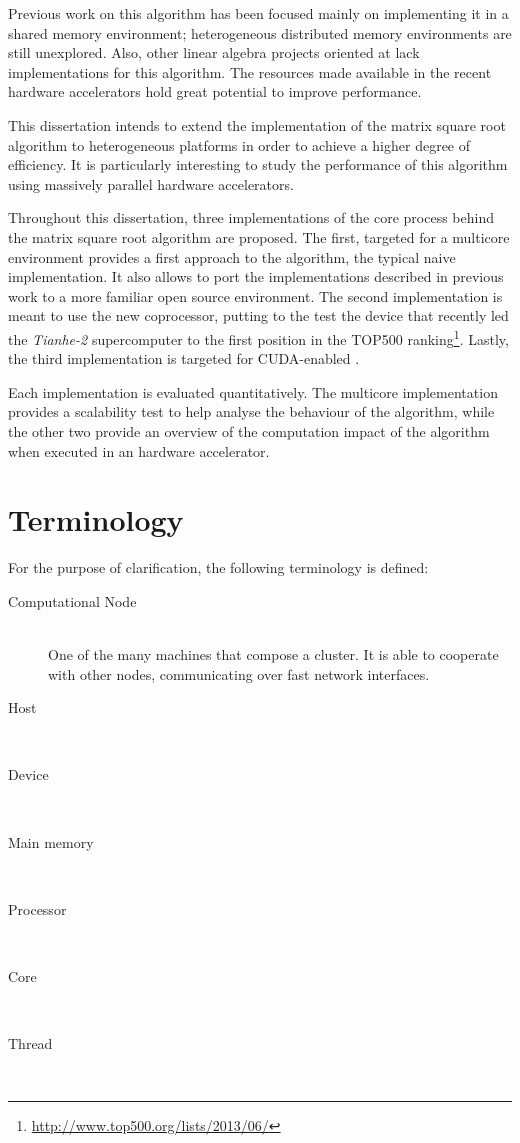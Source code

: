 \documentclass[../thesis]{subfiles}
\begin{document}
	Previous work on this algorithm has been focused mainly on implementing it in a \cpu shared memory environment; heterogeneous distributed memory environments are still unexplored. Also, other linear algebra projects oriented at \gpus lack implementations for this algorithm. The resources made available in the recent hardware accelerators hold great potential to improve performance.

	This dissertation intends to extend the implementation of the matrix square root algorithm to heterogeneous platforms in order to achieve a higher degree of efficiency. It is particularly interesting to study the performance of this algorithm using massively parallel hardware accelerators.

	Throughout this dissertation, three implementations of the core process behind the matrix square root algorithm are proposed. The first, targeted for a multicore environment provides a first approach to the algorithm, the typical naive implementation. It also allows to port the implementations described in previous work to a more familiar open source environment. The second implementation is meant to use the new \intel\xeonphi coprocessor, putting to the test the device that recently led the \textit{Tianhe-2} supercomputer to the first position in the TOP500 ranking\footnote{\url{http://www.top500.org/lists/2013/06/}}. Lastly, the third implementation is targeted for CUDA-enabled \gpus.

	Each implementation is evaluated quantitatively. The multicore implementation provides a scalability test to help analyse the behaviour of the algorithm, while the other two provide an overview of the computation impact of the algorithm when executed in an hardware accelerator.

	\section{Terminology}
	For the purpose of clarification, the following terminology is defined:
		\begin{description}
			\item [Computational Node]\hfill\\ One of the many machines that compose a cluster. It is able to cooperate with other nodes, communicating over fast network interfaces.
			\item [Host]\hfill\\
			\item [Device]\hfill\\
			\item [Main memory]\hfill\\
			\item [Processor]\hfill\\
			\item [Core]\hfill\\
			\item [Thread]\hfill\\
		\end{description}
\end{document}
